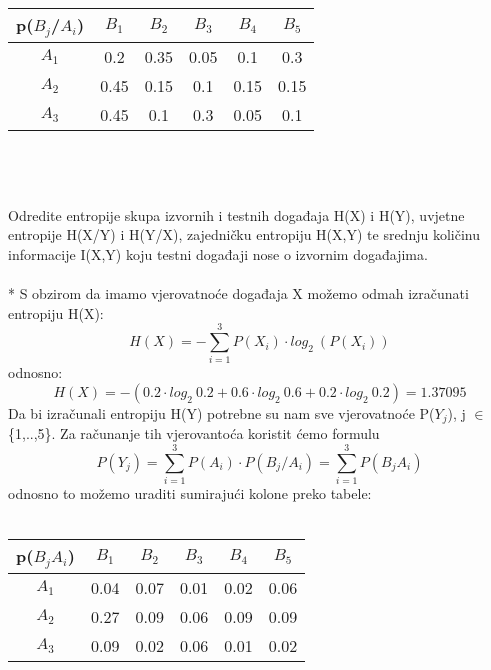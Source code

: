 \documentclass[12pt]{article}
\begin{document}
\begin{enumerate}
\begin{tabular}{|c|c|c|c|c|c|}
\hline
p(${B_j}$/${A_i}$) & ${B_1}$   & ${B_2}$   &  ${B_3}$  & ${B_4}$ & ${B_5}$   \\ \hline
${A_1}$                           & 0.2  & 0.35 & 0.05 & 0.1  & 0.3  \\ \hline
${A_2}$                          & 0.45 & 0.15 & 0.1  & 0.15 & 0.15 \\ \hline
${A_3}$                         & 0.45 & 0.1  & 0.3  & 0.05 & 0.1  \\ \hline
\end{tabular} \\ 
\\ 
\\ 
Odredite entropije skupa izvornih i testnih događaja H(X) i H(Y), uvjetne entropije H(X/Y) i H(Y/X), zajedničku entropiju H(X,Y) te srednju količinu informacije I(X,Y) koju testni događaji nose o izvornim događajima. \\
\\
* S obzirom da imamo vjerovatnoće događaja X možemo odmah izračunati
entropiju H(X):
\begin{equation*}
    H(X) = - \sum_{i = 1}^3 P(X_i) \cdot log_2~(P(X_i))
\end{equation*}
odnosno:
\begin{equation*}
    H(X) = - (0.2 \cdot log_2~0.2 + 0.6 \cdot log_2~0.6 + 0.2 \cdot log_2~0.2) = 1.37095
\end{equation*}
Da bi izračunali entropiju H(Y) potrebne su nam sve vjerovatnoće
P($Y_j$), j {$\in$} \{1,..,5\}. Za računanje tih vjerovantoća koristit ćemo formulu
\begin{equation*}
    P(Y_j) = \sum_{i = 1}^3 P(A_i) \cdot P(B_j/A_i) = \sum_{i = 1}^3 P(B_jA_i)
\end{equation*}
odnosno to možemo uraditi sumirajući kolone preko tabele:  \\
\\
\begin{tabular}{|c|c|c|c|c|c|}
\hline
p(${B_j}$${A_i}$) & ${B_1}$   & ${B_2}$   &  ${B_3}$  & ${B_4}$ & ${B_5}$   \\ \hline
${A_1}$                           & 0.04  & 0.07 & 0.01 & 0.02  & 0.06  \\ \hline
${A_2}$                          & 0.27 & 0.09 & 0.06  & 0.09 & 0.09 \\ \hline
${A_3}$                         & 0.09 & 0.02  & 0.06  & 0.01 & 0.02  \\ \hline
\end{tabular} \\
\\ 


\end{enumerate}
\end{document}
